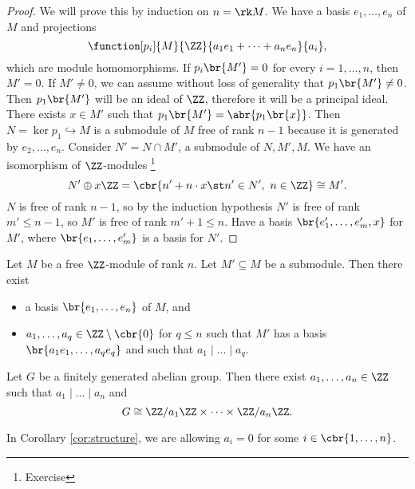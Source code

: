 \begin{proof}
We will prove this by induction on $ n = \rk M $. We have a basis $ e_1, \dots, e_n $ of $ M $ and projections
$$ \function[p_i]{M}{\ZZ}{a_1e_1 + \dots + a_ne_n}{a_i}, $$
which are module homomorphisms. If $ p_i\br{M'} = 0 $ for every $ i = 1, \dots, n $, then $ M' = 0 $. If $ M' \ne 0 $, we can assume without loss of generality that $ p_1\br{M'} \ne 0 $. Then $ p_1\br{M'} $ will be an ideal of $ \ZZ $, therefore it will be a principal ideal. There exists $ x \in M' $ such that $ p_1\br{M'} = \abr{p_1\br{x}} $. Then $ N = \ker p_1 \hookrightarrow M $ is a submodule of $ M $ free of rank $ n - 1 $ because it is generated by $ e_2, \dots, e_n $. Consider $ N' = N \cap M' $, a submodule of $ N, M', M $. We have an isomorphism of $ \ZZ $-modules \footnote{Exercise}
$$ N' \oplus x\ZZ = \cbr{n' + n \cdot x \st n' \in N', \ n \in \ZZ} \cong M'. $$
$ N $ is free of rank $ n - 1 $, so by the induction hypothesis $ N' $ is free of rank $ m' \le n - 1 $, so $ M' $ is free of rank $ m' + 1 \le n $. Have a basis $ \br{e_1', \dots, e_m', x} $ for $ M' $, where $ \br{e_1, \dots, e_m'} $ is a basis for $ N' $.
\end{proof}

\begin{theorem}
\label{thm:structure}
Let $ M $ be a free $ \ZZ $-module of rank $ n $. Let $ M' \subseteq M $ be a submodule. Then there exist
\begin{itemize}
\item a basis $ \br{e_1, \dots, e_n} $ of $ M $, and
\item $ a_1, \dots, a_q \in \ZZ \setminus \cbr{0} $ for $ q \le n $ such that $ M' $ has a basis $ \br{a_1e_1, \dots, a_qe_q} $ and such that $ a_1 \mid \dots \mid a_q $.
\end{itemize}
\end{theorem}

\begin{corollary}
\label{cor:structure}
Let $ G $ be a finitely generated abelian group. Then there exist $ a_1, \dots, a_n \in \ZZ $ such that $ a_1 \mid \dots \mid a_n $ and
$$ G \cong \ZZ / a_1\ZZ \times \dots \times \ZZ / a_n\ZZ. $$
\end{corollary}


\begin{remark*}
In Corollary \ref{cor:structure}, we are allowing $ a_i = 0 $ for some $ i \in \cbr{1, \dots, n} $.
\end{remark*}

